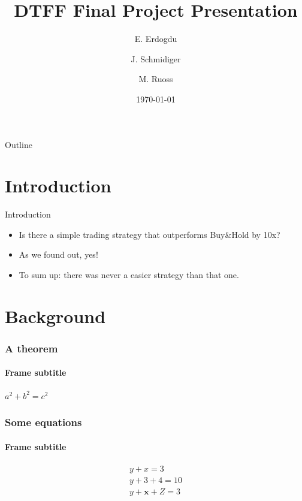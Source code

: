 \documentclass{beamer}
\title{DTFF Final Project Presentation}
\author[E. Erdogdu, J. Schmidiger, M. Ruoss] %
{E. Erdogdu\inst{1} \and J. Schmidiger\inst{2} \and M. Ruoss\inst{3}}
\institute[UZH] %
{
  \inst{1}%
  Faculty of Banking and Finance\\
  Very Famous University
  \and
  \inst{2}%
  Faculty of Banking and Finance\\
  Very Famous University
  \and
  \inst{3}%
  Faculty of Banking and Finance\\
  Very Famous University
}
\date{\today}
\begin{document}
\frame{\titlepage}

\begin{frame}{Outline}
  \tableofcontents
\end{frame}

\section{Introduction}
\begin{frame}{Introduction}
  \begin{itemize}
    \item Is there a simple trading strategy that outperforms Buy\&Hold by 10x?
    \item As we found out, yes!
    \item To sum up: there was never a easier strategy than that one.
  \end{itemize}
\end{frame}

\section{Background}
\begin{frame}
    \frametitle{A theorem}
    \framesubtitle{Frame subtitle}
    \begin{theorem}
        $a^2 + b^2 = c^2$
    \end{theorem}
\end{frame}

\begin{frame}
    \frametitle{Some equations}
    \framesubtitle{Frame subtitle}
        \begin{align}
            y + x = 3\\
            y + 3 + 4 = 10\\
            y + \mathbf{x} + Z = 3
        \end{align}
\end{frame}
\end{document}
